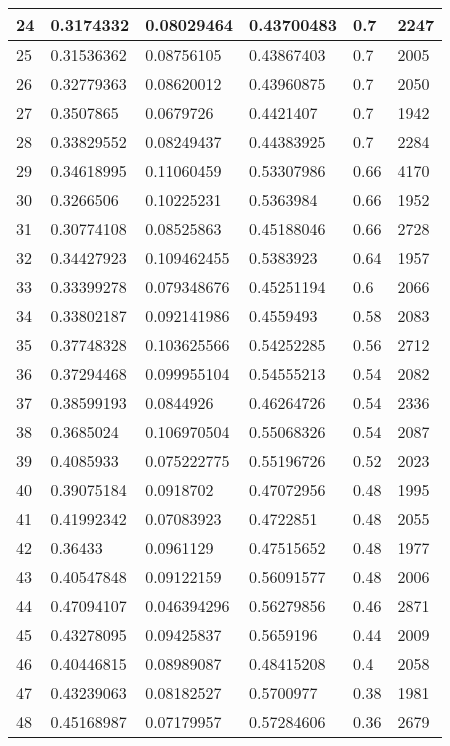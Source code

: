 \begin{longtable}{|l|l|l|l|l|l|}
24 & 0.3174332 & 0.08029464 & 0.43700483 & 0.7 & 2247 \\ \hline 
25 & 0.31536362 & 0.08756105 & 0.43867403 & 0.7 & 2005 \\ \hline 
26 & 0.32779363 & 0.08620012 & 0.43960875 & 0.7 & 2050 \\ \hline 
27 & 0.3507865 & 0.0679726 & 0.4421407 & 0.7 & 1942 \\ \hline 
28 & 0.33829552 & 0.08249437 & 0.44383925 & 0.7 & 2284 \\ \hline 
29 & 0.34618995 & 0.11060459 & 0.53307986 & 0.66 & 4170 \\ \hline 
30 & 0.3266506 & 0.10225231 & 0.5363984 & 0.66 & 1952 \\ \hline 
31 & 0.30774108 & 0.08525863 & 0.45188046 & 0.66 & 2728 \\ \hline 
32 & 0.34427923 & 0.109462455 & 0.5383923 & 0.64 & 1957 \\ \hline 
33 & 0.33399278 & 0.079348676 & 0.45251194 & 0.6 & 2066 \\ \hline 
34 & 0.33802187 & 0.092141986 & 0.4559493 & 0.58 & 2083 \\ \hline 
35 & 0.37748328 & 0.103625566 & 0.54252285 & 0.56 & 2712 \\ \hline 
36 & 0.37294468 & 0.099955104 & 0.54555213 & 0.54 & 2082 \\ \hline 
37 & 0.38599193 & 0.0844926 & 0.46264726 & 0.54 & 2336 \\ \hline 
38 & 0.3685024 & 0.106970504 & 0.55068326 & 0.54 & 2087 \\ \hline 
39 & 0.4085933 & 0.075222775 & 0.55196726 & 0.52 & 2023 \\ \hline 
40 & 0.39075184 & 0.0918702 & 0.47072956 & 0.48 & 1995 \\ \hline 
41 & 0.41992342 & 0.07083923 & 0.4722851 & 0.48 & 2055 \\ \hline 
42 & 0.36433 & 0.0961129 & 0.47515652 & 0.48 & 1977 \\ \hline 
43 & 0.40547848 & 0.09122159 & 0.56091577 & 0.48 & 2006 \\ \hline 
44 & 0.47094107 & 0.046394296 & 0.56279856 & 0.46 & 2871 \\ \hline 
45 & 0.43278095 & 0.09425837 & 0.5659196 & 0.44 & 2009 \\ \hline 
46 & 0.40446815 & 0.08989087 & 0.48415208 & 0.4 & 2058 \\ \hline 
47 & 0.43239063 & 0.08182527 & 0.5700977 & 0.38 & 1981 \\ \hline 
48 & 0.45168987 & 0.07179957 & 0.57284606 & 0.36 & 2679 \\ \hline 

\end{longtable}
